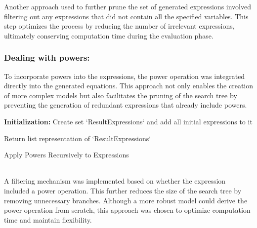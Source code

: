 \documentclass{article}
\begin{document}
Another approach used to further prune the set of generated expressions involved filtering out any expressions that did not contain all the specified variables. This step optimizes the process by reducing the number of irrelevant expressions, ultimately conserving computation time during the evaluation phase.\\



\subsubsection{Dealing with powers:}

To incorporate powers into the expressions, the power operation was integrated directly into the generated equations. This approach not only enables the creation of more complex models but also facilitates the pruning of the search tree by preventing the generation of redundant expressions that already include powers.\\




\begin{algorithm}[H]
\SetAlgoLined
{}

\textbf{Initialization:}\;
Create set `ResultExpressions` and add all initial expressions to it\;


Return list representation of `ResultExpressions`\;

\caption{Apply Powers Recursively to Expressions}
\label{alg:apply_powers} %
\end{algorithm}\\




A filtering mechanism was implemented based on whether the expression included a power operation. This further reduces the size of the search tree by removing unnecessary branches. Although a more robust model could derive the power operation from scratch, this approach was chosen to optimize computation time and maintain flexibility.\\
\end{document}
